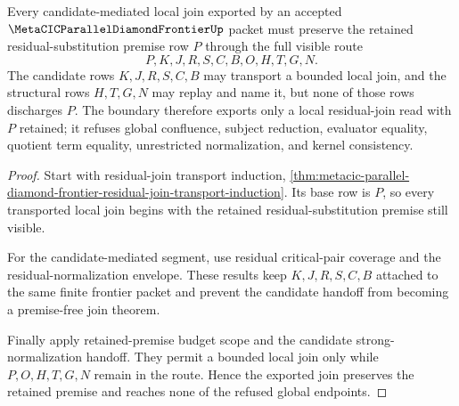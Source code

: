 \begin{theorem}
\label{thm:metacic-parallel-diamond-frontier-retained-premise-discharge}
Every candidate-mediated local join exported by an accepted $\MetaCICParallelDiamondFrontierUp$ packet must preserve the retained residual-substitution premise row $P$ through the full visible route
$$
P,K,J,R,S,C,B,O,H,T,G,N.
$$
The candidate rows $K,J,R,S,C,B$ may transport a bounded local join, and the structural rows $H,T,G,N$ may replay and name it, but none of those rows discharges $P$. The boundary therefore exports only a local residual-join read with $P$ retained; it refuses global confluence, subject reduction, evaluator equality, quotient term equality, unrestricted normalization, and kernel consistency.
\end{theorem}
\begin{proof}
Start with residual-join transport induction, \autoref{thm:metacic-parallel-diamond-frontier-residual-join-transport-induction}. Its base row is $P$, so every transported local join begins with the retained residual-substitution premise still visible.

For the candidate-mediated segment, use residual critical-pair coverage and the residual-normalization envelope. These results keep $K,J,R,S,C,B$ attached to the same finite frontier packet and prevent the candidate handoff from becoming a premise-free join theorem.

Finally apply retained-premise budget scope and the candidate strong-normalization handoff. They permit a bounded local join only while $P,O,H,T,G,N$ remain in the route. Hence the exported join preserves the retained premise and reaches none of the refused global endpoints.
\end{proof}

